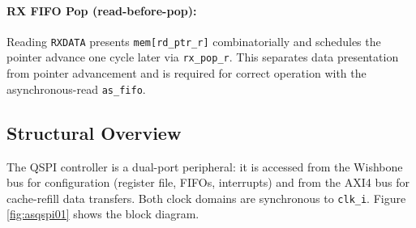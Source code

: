 \paragraph{RX FIFO Pop (read-before-pop):}
Reading \texttt{RXDATA} presents \texttt{mem[rd\_ptr\_r]} combinatorially and
schedules the pointer advance one cycle later via \texttt{rx\_pop\_r}. This
separates data presentation from pointer advancement and is required for
correct operation with the asynchronous-read \texttt{as\_fifo}.


\subsection{Structural Overview}
The QSPI controller is a dual-port peripheral: it is accessed from the Wishbone bus for
configuration (register file, FIFOs, interrupts) and from the AXI4 bus for cache-refill
data transfers. Both clock domains are synchronous to \texttt{clk\_i}. Figure \ref{fig:asqspi01}
shows the block diagram.

